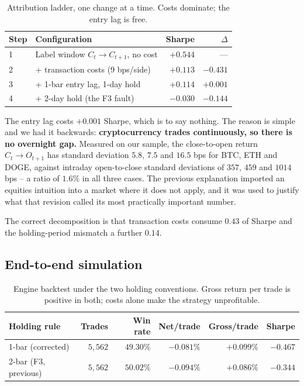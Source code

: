 \documentclass[preprint,12pt,authoryear]{elsarticle}
\begin{document}
\begin{table}[t]\centering\small
\caption{Attribution ladder, one change at a time. Costs dominate; the entry lag
is free.}
\label{tab:ladder}
\begin{tabular}{@{}llrr@{}}
\toprule
Step & Configuration & Sharpe & $\Delta$ \\
\midrule
1 & Label window $C_t \to C_{t+1}$, no cost      & $+0.544$ & --- \\
2 & \quad + transaction costs (9 bps/side)       & $+0.113$ & $\mathbf{-0.431}$ \\
3 & \quad + 1-bar entry lag, 1-day hold          & $+0.114$ & $+0.001$ \\
4 & \quad + 2-day hold (the F3 fault)            & $-0.030$ & $-0.144$ \\
\bottomrule
\end{tabular}
\end{table}

The entry lag costs $+0.001$ Sharpe, which is to say nothing. The reason is
simple and we had it backwards: \textbf{cryptocurrency trades continuously, so
there is no overnight gap.} Measured on our sample, the close-to-open return
$C_t \to O_{t+1}$ has standard deviation $5.8$, $7.5$ and $16.5$ bps for BTC, ETH
and DOGE, against intraday open-to-close standard deviations of $357$, $459$ and
$1014$ bps -- a ratio of $1.6\%$ in all three cases. The previous explanation
imported an equities intuition into a market where it does not apply, and it was
used to justify what that revision called its most practically important number.

The correct decomposition is that transaction costs consume $0.43$ of Sharpe and
the holding-period mismatch a further $0.14$.

\subsection{End-to-end simulation}
\label{ssec:e2e}

\begin{table}[t]\centering\small
\caption{Engine backtest under the two holding conventions. Gross return per
trade is positive in both; costs alone make the strategy unprofitable.}
\label{tab:bt}
\begin{tabular}{@{}lrrrrr@{}}
\toprule
Holding rule & Trades & Win rate & Net/trade & Gross/trade & Sharpe \\
\midrule
1-bar (corrected)          & $5{,}562$ & $49.30\%$ & $-0.081\%$ & $+0.099\%$ & $-0.467$ \\
2-bar (F3, previous)       & $5{,}562$ & $50.02\%$ & $-0.094\%$ & $+0.086\%$ & $-0.344$ \\
\bottomrule
\end{tabular}
\end{table}
\end{document}
